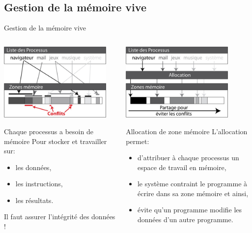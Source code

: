 \subsection{Gestion de la mémoire vive}
\begin{frame}{Gestion de la mémoire vive}
  \begin{columns}
    \begin{column}{6cm}
      \includegraphics[width=5.5cm]{img/s03/Alloc_mem_1.jpg}
      \begin{block}{Chaque processus a besoin de mémoire}
        Pour stocker et travailler sur:
        \begin{itemize}
        \item les données,
        \item les instructions,
        \item les résultats.
        \end{itemize}
      \end{block}
      \begin{alertblock}{Il faut assurer l'intégrité des données !}
      \end{alertblock}
    \end{column}
    \begin{column}{6cm}
      \includegraphics[width=5.5cm]{img/s03/Alloc_mem_2.jpg}
      \begin{block}{Allocation de zone mémoire}
        L'allocation permet:
        \begin{itemize}
        \item d'attribuer à chaque processus un espace de travail en
          mémoire,
        \item le système contraint le programme à écrire dans sa zone
          mémoire et ainsi,
        \item évite qu'un programme modifie les données d'un autre
          programme.
        \end{itemize}
      \end{block}
    \end{column}
  \end{columns}
\end{frame}
